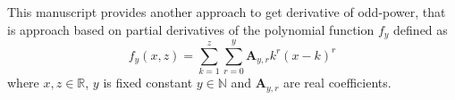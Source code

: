 This manuscript provides another approach to get derivative of odd-power, that is approach based on partial derivatives
of the polynomial function $f_y$ defined as
\[
    f_{y} (x, z) = \sum_{k=1}^{z} \sum_{r=0}^{y} \mathbf{A}_{y,r} k^r (x-k)^r
\]
where $x, z\in \mathbb{R}$, $y$ is fixed constant $y \in \mathbb{N}$ and $\mathbf{A}_{y,r}$ are real coefficients.